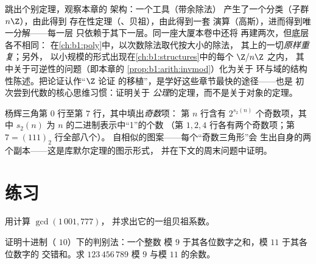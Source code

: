 \begin{remark}[插曲：作为模板的 $\Z$]\label{rem:b1:arith:interlude}
跳出个别定理，观察本章的
架构：一个工具（带余除法）
产生了一个分类（子群 $n\Z$），由此得到
存在性定理（、贝祖），由此得到一套
演算（高斯），进而得到唯一分解——每一层
只依赖于其下一层。同一座大厦本卷中还将
再建两次，但底层各不相同：
在\cref{ch:b1:poly}中，以次数除法取代按大小的除法，
其上的一切\emph{原样重复}；另外，
以小规模的形式出现在\cref{ch:b1:structures}中的每个 $\Z/n\Z$ 之内，
其中关于可逆性的问题（即本章的
\cref{prop:b1:arith:invmod}）化为关于
环与域的结构性陈述。把论证认作“$\Z$ 论证
的移植”，是学好这些章节最快的途径——也是
初次尝到代数的核心思维习惯：证明关于
\emph{公理}的定理，而不是关于对象的定理。
\end{remark}

\begin{omfigure}

{\small 杨辉三角第 $0$ 行至第 $7$ 行，其中填出\emph{奇数}项：
第 $n$ 行含有 $2^{s_2(n)}$ 个奇数项，其中
$s_2(n)$ 为 $n$ 的二进制表示中“1”的个数
（第 $1, 2, 4$ 行各有两个奇数项；第 $7 = (111)_2$ 行全部八个）。
自相似的图案——每个“奇数三角形”会
生出自身的两个副本——这是库默尔定理的图示形式，
并在下文的周末问题中证明。}
\end{omfigure}

\section{练习}

\begin{exercise}[$\star$]\label{exo:b1:arith:1}
用计算 $\gcd(1\,001, 777)$，
并求出它的一组贝祖系数。
\end{exercise}

\begin{exercise}[$\star$]\label{exo:b1:arith:2}
证明十进制（ $10$）下的判别法：一个整数
模 $9$ 于其各位数字之和，模 $11$ 于其各位数字的
交错和。求 $123\,456\,789$ 模 $9$ 与模 $11$ 的余数。
\end{exercise}

